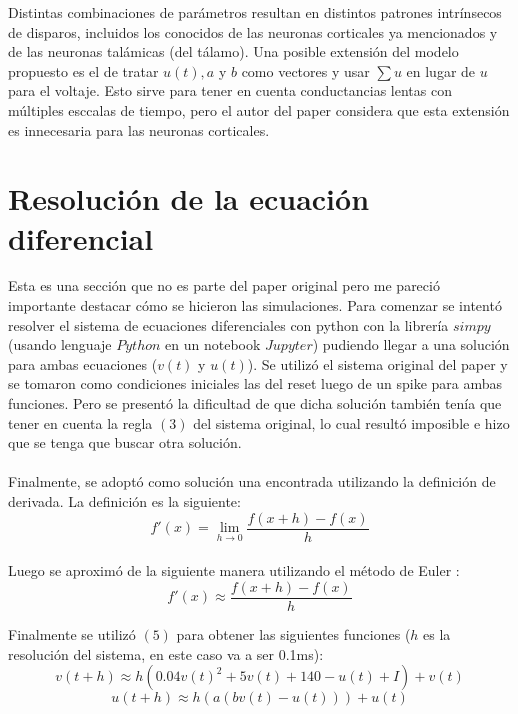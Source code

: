 \documentclass[12pt]{article}
\begin{document}
Distintas combinaciones de parámetros resultan en distintos patrones intrínsecos de disparos, incluidos los conocidos de las neuronas corticales ya mencionados y de las neuronas talámicas (del tálamo).
Una posible extensión del modelo propuesto es el de tratar $u(t), a$ y $b$ como vectores y usar $\sum{u}$ en lugar de $u$ para el voltaje. Esto sirve para tener en cuenta conductancias lentas con múltiples esccalas de tiempo, pero el autor del paper considera que esta extensión es innecesaria para las neuronas corticales.

\section{Resolución de la ecuación diferencial}

Esta es una sección que no es parte del paper original pero me pareció importante destacar cómo se hicieron las simulaciones. Para comenzar se intentó resolver el sistema de ecuaciones diferenciales con python con la librería $simpy$ \cite{Sympy} (usando lenguaje $Python$ en un notebook $Jupyter$)
pudiendo llegar a una solución para ambas ecuaciones ($v(t)$ y $u(t)$). Se utilizó el sistema original del paper y se tomaron como condiciones iniciales las del reset luego de un spike para ambas funciones.
Pero se presentó la dificultad de que dicha solución también tenía que tener en cuenta la regla $(3)$ del sistema original, lo cual resultó imposible e hizo que se tenga que buscar otra solución. \\ \\
Finalmente, se adoptó como solución una encontrada utilizando la definición de derivada. La definición es la siguiente: \\
\begin{equation}
    f'(x) = \lim_{h \to 0} \frac{f(x + h) - f(x)}{h}
\end{equation}
\\
Luego se aproximó de la siguiente manera utilizando el método de Euler \cite{Euler}:
\begin{equation}
    f'(x) \approx \frac{f(x + h) - f(x)}{h}
\end{equation}

Finalmente se utilizó $(5)$ para obtener las siguientes funciones ($h$ es la resolución del sistema, en este caso va a ser 0.1ms):
\begin{equation}
    v(t + h) \approx h(0.04 v(t)^2 + 5 v(t) + 140 - u(t) + I) + v(t)
\end{equation}
\begin{equation}
    u(t + h) \approx h(a(b v(t) - u(t))) + u(t)
\end{equation}
\end{document}
